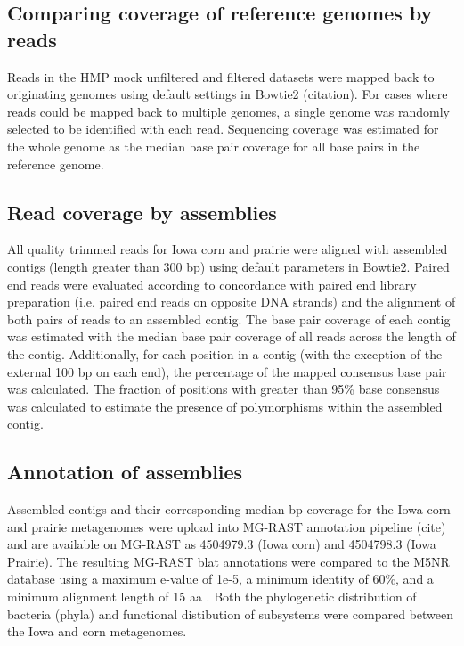 \documentclass[11pt]{article} %
\begin{document}
\subsection{Comparing coverage of reference genomes by reads}
Reads in the HMP mock unfiltered and filtered datasets were mapped back to originating genomes using default settings in Bowtie2 (citation).  For cases where reads could be mapped back to multiple genomes, a single genome was randomly selected to be identified with each read.  Sequencing coverage was estimated for the whole genome as the median base pair coverage for all base pairs in the reference genome.  

\subsection{Read coverage by assemblies}
All quality trimmed reads for Iowa corn and prairie were aligned with assembled contigs (length greater than 300 bp) using default parameters in Bowtie2.  Paired end reads were evaluated according to concordance with paired end library preparation (i.e. paired end reads  on opposite DNA strands) and the alignment of both pairs of reads to an assembled contig.  The base pair coverage of each contig was estimated with the median base pair coverage of all reads across the length of the contig.  Additionally, for each position in a contig (with the exception of the external 100 bp on each end), the percentage of the mapped consensus base pair was calculated.  The fraction of positions with greater than 95\% base consensus was calculated to estimate the presence of polymorphisms within the assembled contig.

\subsection {Annotation of assemblies}
Assembled contigs and their corresponding median bp coverage for the Iowa corn and prairie metagenomes were upload into MG-RAST annotation pipeline (cite) and are available on MG-RAST as 4504979.3 (Iowa corn) and 4504798.3  (Iowa Prairie).  The resulting MG-RAST blat annotations were compared to the M5NR database using a maximum e-value of 1e-5, a minimum identity of 60\%, and a minimum alignment length of 15 aa .  Both the phylogenetic distribution of bacteria (phyla) and functional distibution of subsystems were compared between the Iowa and corn metagenomes.  
  
\end{document}
